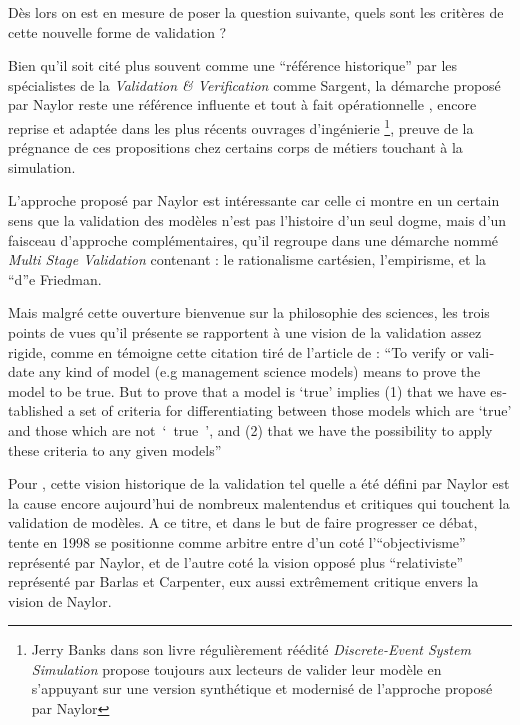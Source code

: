Dès lors on est en mesure de poser la question suivante, quels sont les critères de cette nouvelle forme de validation ?


Bien qu'il soit cité plus souvent comme une \enquote{référence historique} par les spécialistes de la \textit{Validation \& Verification} comme Sargent, la démarche proposé par Naylor reste une référence influente et tout à fait opérationnelle \autocite{Nance2002}, encore reprise et adaptée dans les plus récents ouvrages d’ingénierie \footnote{Jerry Banks dans son livre régulièrement réédité \textit{Discrete-Event System Simulation} propose toujours aux lecteurs de valider leur modèle en s'appuyant sur une version synthétique et modernisé de l'approche proposé par Naylor}, preuve de la prégnance de ces propositions chez certains corps de métiers touchant à la simulation.

L'approche proposé par Naylor est intéressante car celle ci montre en un certain sens que la validation des modèles n'est pas l'histoire d'un seul dogme, mais d'un faisceau d'approche complémentaires, qu'il regroupe dans une démarche nommé \textit{Multi Stage Validation} contenant : le rationalisme cartésien, l'empirisme, et la \foreignquote{positive economics} de Friedman.

Mais malgré cette ouverture bienvenue sur la philosophie des sciences, les trois points de vues qu'il présente se rapportent à une vision de la validation assez rigide, comme en témoigne cette citation tiré de l'article de \textcite{Naylor1967} : \foreignquote{english}{To verify or validate any kind of model (e.g management science models) means to prove the model to be true. But to prove that a model is \enquote{true} implies (1) that we have established a set of criteria for differentiating between those models which are \enquote{true} and those which are not \enquote{ true }, and (2) that we have the possibility to apply these criteria to any given models}

Pour \textcite{Kleindorfer1998}, cette vision historique de la validation tel quelle a été défini par Naylor est la cause encore aujourd'hui de nombreux malentendus et critiques qui touchent la validation de modèles. A ce titre, et dans le but de faire progresser ce débat, \textcite{Kleindorfer1998} tente en 1998 se positionne comme arbitre entre d'un coté l'\enquote{objectivisme} représenté par Naylor, et de l'autre coté la vision opposé plus \enquote{relativiste} représenté par Barlas et Carpenter, eux aussi extrêmement critique envers la vision de Naylor.

